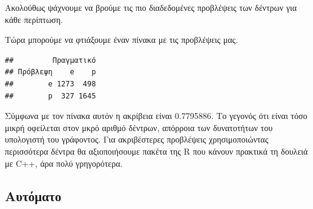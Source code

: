 \documentclass[
]{article}
\newenvironment{Shaded}{\begin{snugshade}}{\end{snugshade}}
\newcommand{\AttributeTok}[1]{\textcolor[rgb]{0.13,0.29,0.53}{#1}}
\newcommand{\CommentTok}[1]{\textcolor[rgb]{0.56,0.35,0.01}{\textit{#1}}}
\newcommand{\ControlFlowTok}[1]{\textcolor[rgb]{0.13,0.29,0.53}{\textbf{#1}}}
\newcommand{\DecValTok}[1]{\textcolor[rgb]{0.00,0.00,0.81}{#1}}
\newcommand{\FunctionTok}[1]{\textcolor[rgb]{0.13,0.29,0.53}{\textbf{#1}}}
\newcommand{\NormalTok}[1]{#1}
\newcommand{\OtherTok}[1]{\textcolor[rgb]{0.56,0.35,0.01}{#1}}
\newcommand{\SpecialCharTok}[1]{\textcolor[rgb]{0.81,0.36,0.00}{\textbf{#1}}}
\begin{document}
Ακολούθως ψάχνουμε να βρούμε τις πιο διαδεδομένες προβλέψεις των δέντρων
για κάθε περίπτωση.

\begin{Shaded}
\end{Shaded}

Τώρα μπορούμε να φτιάξουμε έναν πίνακα με τις προβλέψεις μας.

\begin{Shaded}
\end{Shaded}

\begin{verbatim}
##         Πραγματικό
## Πρόβλεψη    e    p
##        e 1273  498
##        p  327 1645
\end{verbatim}

Σύμφωνα με τον πίνακα αυτόν η ακρίβεια είναι 0.7795886. Το γεγονός ότι
είναι τόσο μικρή οφείλεται στον μκρό αριθμό δέντρων, απόρροια των
δυνατοτήτων του υπολογιστή του γράφοντος. Για ακριβέστερες προβλέψεις
χρησιμοποιώντας περισσότερα δέντρα θα αξιοποιήσουμε πακέτα της R που
κάνουν πρακτικά τη δουλειά με C++, άρα πολύ γρηγορότερα.

\subsection{Αυτόματο}\label{ux3b1ux3c5ux3c4ux3ccux3bcux3b1ux3c4ux3bf}
\end{document}
